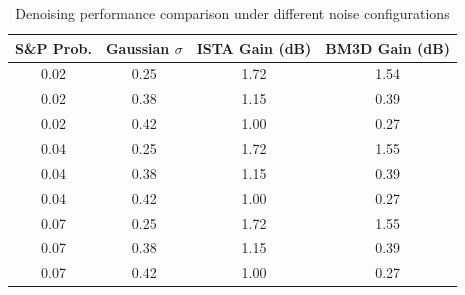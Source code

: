 \usepackage{booktabs}
\begin{table}[htbp]
\centering
\caption{Denoising performance comparison under different noise configurations}
\label{tab:denoising_results}
\begin{tabular}{cccc}
\toprule
S\&P Prob. & Gaussian $\sigma$ & ISTA Gain (dB) & BM3D Gain (dB) \\
\midrule
\toprule
0.02 & 0.25 & 1.72 & 1.54 \\
0.02 & 0.38 & 1.15 & 0.39 \\
0.02 & 0.42 & 1.00 & 0.27 \\
0.04 & 0.25 & 1.72 & 1.55 \\
0.04 & 0.38 & 1.15 & 0.39 \\
0.04 & 0.42 & 1.00 & 0.27 \\
0.07 & 0.25 & 1.72 & 1.55 \\
0.07 & 0.38 & 1.15 & 0.39 \\
0.07 & 0.42 & 1.00 & 0.27 \\
\bottomrule
\bottomrule
\end{tabular}
\end{table}
